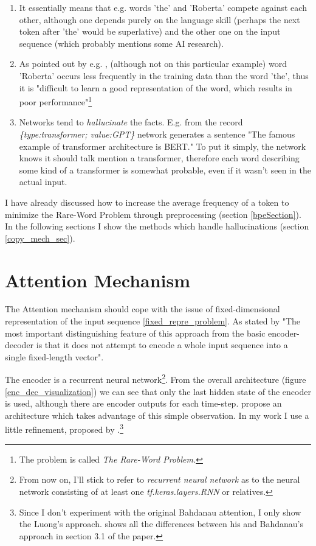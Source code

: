 \begin{enumerate}
    \item It essentially means that e.g. words 'the' and 'Roberta' compete against each other, although one depends purely on the language skill (perhaps the next token after 'the' would be superlative) and the other one on the input sequence (which probably mentions some AI research).
    \item As pointed out by e.g. \citep{gulcehre2016pointing}, (although not on this particular example) word 'Roberta' occurs less frequently in the training data than the word 'the', thus it is "difficult to learn a good representation of the word, which results in poor performance"\footnote{The problem is called \emph{The Rare-Word Problem.}}
    \item Networks tend to \emph{hallucinate} the facts. E.g. from the record \emph{\{type:transfor\-mer; value:GPT\}} network generates a sentence "The famous example of transformer architecture is BERT." To put it simply, the network knows it should talk mention a transformer, therefore each word describing some kind of a transformer is somewhat probable, even if it wasn't seen in the actual input.
\end{enumerate}

I have already discussed how to increase the average frequency of a token to minimize the Rare-Word Problem through preprocessing (section \ref{bpeSection}). In the following sections I show the methods which handle hallucinations (section \ref{copy_mech_sec}).

\section{Attention Mechanism}

The Attention mechanism should cope with the issue of fixed-dimensional representation of the input sequence \ref{fixed_repre_problem}. As stated by \citep{bahdanau2016neural} "The most important distinguishing feature of this approach from the basic encoder-decoder is that it does not attempt to encode a whole input sequence into a single fixed-length vector".

The encoder is a recurrent neural network\footnote{From now on, I'll stick to refer to \emph{recurrent neural network} as to the neural network consisting of at least one \emph{tf.keras.layers.RNN} or relatives.}. From the overall architecture (figure \ref{enc_dec_visualization}) we can see that only the last hidden state of the encoder is used, although there are encoder outputs for each time-step. \citep{bahdanau2016neural} propose an architecture which takes advantage of this simple observation. In my work I use a little refinement, proposed by \citep{luong2015effective}.\footnote{Since I don't experiment with the original Bahdanau attention, I only show the Luong's approach. \citep{luong2015effective} shows all the differences between his and Bahdanau's approach in section 3.1 of the paper.}

